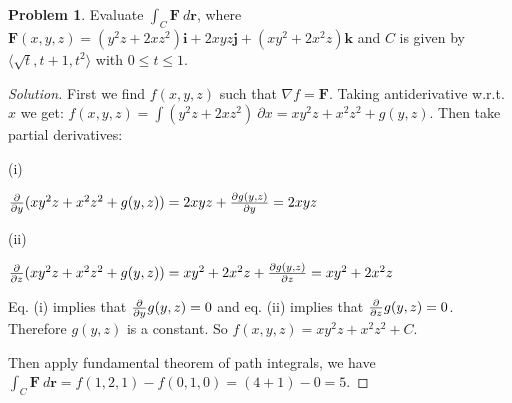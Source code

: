 \documentclass[12pt]{amsart}%
\theoremstyle{plain}
\theoremstyle{definition}
\newtheorem{prob}[theorem]{Problem}
\theoremstyle{special}
\newcommand{\sol}[1]{
{\begin{proof}[Solution]#1\end{proof}}
}
\newcommand{\Prob}[1]{\begin{tcolorbox}%
\begin{prob}
	#1
\end{prob}
\end{tcolorbox}	
}
\renewcommand{\vec}{\mathbf}
\begin{document}
\Prob{ Evaluate $\int_C\vec F \ d\vec r$, where 
\(\vec F(x,y,z)=(y^2z+2xz^2)\vec i+2xyz\vec j+(xy^2+2x^2z)\vec k\)
and $C$ is given by $\langle \sqrt{t},t+1,t^2\rangle$ with $0\leq t\leq 1$.}
\sol{
First we find $f(x,y,z)$ such that $\nabla f=\vec F$. Taking antiderivative w.r.t. $x$ we get:
\(f(x,y,z)=\int (y^2z+2xz^2)\ \partial x=xy^2z+x^2z^2+g(y,z)\). Then take partial derivatives:

(i)\centerline{\({\partial\over \partial y}(xy^2z+x^2z^2+g(y,z))=2xyz+{\partial g(y,z)\over \partial y}=2xyz\)}
(ii)\centerline{\({\partial\over \partial z}(xy^2z+x^2z^2+g(y,z))=xy^2+2x^2z+{\partial g(y,z)\over \partial z}=xy^2+2x^2z\)}

Eq. (i) implies that ${\partial\over\partial y}g(y,z)=0$ and eq. (ii) implies that ${\partial\over\partial z}g(y,z)=0$. Therefore $g(y,z)$ is a constant. So $f(x,y,z)=xy^2z+x^2z^2+C$.

Then apply fundamental theorem of path integrals, we have
\(\int_C\vec F \ d\vec r=f(1,2,1)-f(0,1,0)=(4+1)-0=5\).
}


\newpage
\end{document}
